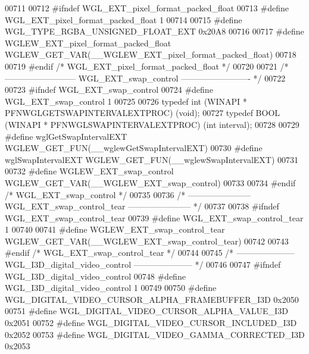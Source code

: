 \begin{DoxyCode}
00711 
00712 \textcolor{preprocessor}{#ifndef WGL\_EXT\_pixel\_format\_packed\_float}
00713 \textcolor{preprocessor}{#define WGL\_EXT\_pixel\_format\_packed\_float 1}
00714 
00715 \textcolor{preprocessor}{#define WGL\_TYPE\_RGBA\_UNSIGNED\_FLOAT\_EXT 0x20A8}
00716 
00717 \textcolor{preprocessor}{#define WGLEW\_EXT\_pixel\_format\_packed\_float WGLEW\_GET\_VAR(\_\_WGLEW\_EXT\_pixel\_format\_packed\_float)}
00718 
00719 \textcolor{preprocessor}{#endif }\textcolor{comment}{/* WGL\_EXT\_pixel\_format\_packed\_float */}\textcolor{preprocessor}{}
00720 
00721 \textcolor{comment}{/* -------------------------- WGL\_EXT\_swap\_control ------------------------- */}
00722 
00723 \textcolor{preprocessor}{#ifndef WGL\_EXT\_swap\_control}
00724 \textcolor{preprocessor}{#define WGL\_EXT\_swap\_control 1}
00725 
00726 \textcolor{keyword}{typedef} int (WINAPI * PFNWGLGETSWAPINTERVALEXTPROC) (void);
00727 \textcolor{keyword}{typedef} BOOL (WINAPI * PFNWGLSWAPINTERVALEXTPROC) (\textcolor{keywordtype}{int} interval);
00728 
00729 \textcolor{preprocessor}{#define wglGetSwapIntervalEXT WGLEW\_GET\_FUN(\_\_wglewGetSwapIntervalEXT)}
00730 \textcolor{preprocessor}{#define wglSwapIntervalEXT WGLEW\_GET\_FUN(\_\_wglewSwapIntervalEXT)}
00731 
00732 \textcolor{preprocessor}{#define WGLEW\_EXT\_swap\_control WGLEW\_GET\_VAR(\_\_WGLEW\_EXT\_swap\_control)}
00733 
00734 \textcolor{preprocessor}{#endif }\textcolor{comment}{/* WGL\_EXT\_swap\_control */}\textcolor{preprocessor}{}
00735 
00736 \textcolor{comment}{/* ----------------------- WGL\_EXT\_swap\_control\_tear ----------------------- */}
00737 
00738 \textcolor{preprocessor}{#ifndef WGL\_EXT\_swap\_control\_tear}
00739 \textcolor{preprocessor}{#define WGL\_EXT\_swap\_control\_tear 1}
00740 
00741 \textcolor{preprocessor}{#define WGLEW\_EXT\_swap\_control\_tear WGLEW\_GET\_VAR(\_\_WGLEW\_EXT\_swap\_control\_tear)}
00742 
00743 \textcolor{preprocessor}{#endif }\textcolor{comment}{/* WGL\_EXT\_swap\_control\_tear */}\textcolor{preprocessor}{}
00744 
00745 \textcolor{comment}{/* --------------------- WGL\_I3D\_digital\_video\_control --------------------- */}
00746 
00747 \textcolor{preprocessor}{#ifndef WGL\_I3D\_digital\_video\_control}
00748 \textcolor{preprocessor}{#define WGL\_I3D\_digital\_video\_control 1}
00749 
00750 \textcolor{preprocessor}{#define WGL\_DIGITAL\_VIDEO\_CURSOR\_ALPHA\_FRAMEBUFFER\_I3D 0x2050}
00751 \textcolor{preprocessor}{#define WGL\_DIGITAL\_VIDEO\_CURSOR\_ALPHA\_VALUE\_I3D 0x2051}
00752 \textcolor{preprocessor}{#define WGL\_DIGITAL\_VIDEO\_CURSOR\_INCLUDED\_I3D 0x2052}
00753 \textcolor{preprocessor}{#define WGL\_DIGITAL\_VIDEO\_GAMMA\_CORRECTED\_I3D 0x2053}

\end{DoxyCode}
